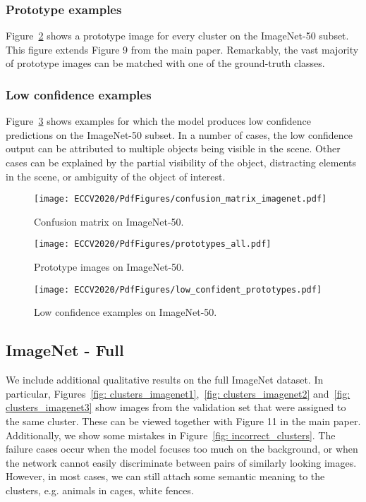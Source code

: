 \documentclass[runningheads]{llncs}
\begin{document}
\subsubsection{Prototype examples}
Figure~\ref{fig: prototypes_imagenet50} shows a prototype image for every cluster on the ImageNet-50 subset. This figure extends Figure 9 from the main paper. Remarkably, the vast majority of prototype images can be matched with one of the ground-truth classes. 

\subsubsection{Low confidence examples}
Figure~\ref{fig: low_confidence_imagenet50} shows examples for which the model produces low confidence predictions on the ImageNet-50 subset. In a number of cases, the low confidence output can be attributed to multiple objects being visible in the scene. Other cases can be explained by the partial visibility of the object, distracting elements in the scene, or ambiguity of the object of interest. 
\begin{figure}[ht]
\centering
\texttt{[image: ECCV2020/PdfFigures/confusion\_matrix\_imagenet.pdf]}
\caption{Confusion matrix on ImageNet-50.}
\label{fig: confusion_imagenet}
\end{figure}

\begin{figure}[t]
\centering
\texttt{[image: ECCV2020/PdfFigures/prototypes\_all.pdf]}
\caption{Prototype images on ImageNet-50.}
\label{fig: prototypes_imagenet50}
\end{figure}

\begin{figure}
\texttt{[image: ECCV2020/PdfFigures/low\_confident\_prototypes.pdf]}
\caption{Low confidence examples on ImageNet-50.}
\label{fig: low_confidence_imagenet50}
\end{figure}

\subsection{ImageNet - Full}
We include additional qualitative results on the full ImageNet dataset. In particular, Figures~\ref{fig: clusters_imagenet1},~\ref{fig: clusters_imagenet2} and~\ref{fig: clusters_imagenet3} show images from the validation set that were assigned to the same cluster. These can be viewed together with Figure 11 in the main paper. Additionally, we show some mistakes in Figure~\ref{fig: incorrect_clusters}. The failure cases occur when the model focuses too much on the background, or when the network cannot easily discriminate between pairs of similarly looking images. However, in most cases, we can still attach some semantic meaning to the clusters, e.g. animals in cages, white fences.
\end{document}
